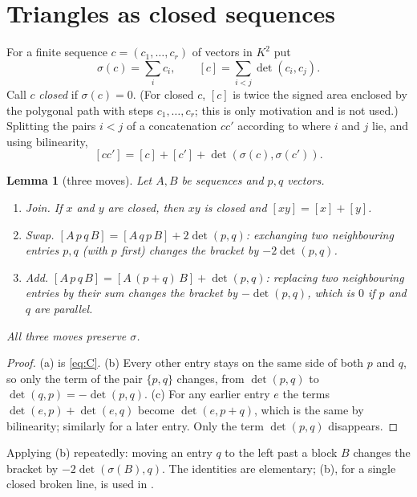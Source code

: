 \documentclass[11pt]{article}
\newtheorem{lemma}[theorem]{Lemma}
\theoremstyle{definition}
\newcommand{\sg}{\sigma}
\newcommand{\ar}[1]{[#1]}
\begin{document}
\section{Triangles as closed sequences}\label{sec:seq}

For a finite sequence $c=(c_1,\dots,c_r)$ of vectors in $K^2$ put
\[ \sg(c)=\sum_ic_i,\qquad\ar c=\sum_{i<j}\det(c_i,c_j). \]
Call $c$ \emph{closed} if $\sg(c)=0$. (For closed $c$, $\ar c$ is twice the signed area enclosed by
the polygonal path with steps $c_1,\dots,c_r$; this is only motivation and is not used.) Splitting
the pairs $i<j$ of a concatenation $cc'$ according to where $i$ and $j$ lie, and using bilinearity,
\begin{equation}\label{eq:C}
\ar{cc'}=\ar c+\ar{c'}+\det(\sg(c),\sg(c')).
\end{equation}

\begin{lemma}[three moves]\label{lem:moves}
Let $A,B$ be sequences and $p,q$ vectors.
\begin{enumerate}[label=(\alph*)]
\item \emph{Join.} If $x$ and $y$ are closed, then $xy$ is closed and $\ar{xy}=\ar x+\ar y$.
\item \emph{Swap.} $\ar{A\,p\,q\,B}=\ar{A\,q\,p\,B}+2\det(p,q)$: exchanging two neighbouring entries
$p,q$ (with $p$ first) changes the bracket by $-2\det(p,q)$.
\item \emph{Add.} $\ar{A\,p\,q\,B}=\ar{A\,(p+q)\,B}+\det(p,q)$: replacing two neighbouring entries by
their sum changes the bracket by $-\det(p,q)$, which is $0$ if $p$ and $q$ are parallel.
\end{enumerate}
All three moves preserve $\sg$.
\end{lemma}

\begin{proof}
(a) is \eqref{eq:C}. (b) Every other entry stays on the same side of both $p$ and $q$, so only the
term of the pair $\{p,q\}$ changes, from $\det(p,q)$ to $\det(q,p)=-\det(p,q)$. (c) For any earlier
entry $e$ the terms $\det(e,p)+\det(e,q)$ become $\det(e,p+q)$, which is the same by bilinearity;
similarly for a later entry. Only the term $\det(p,q)$ disappears.
\end{proof}

Applying (b) repeatedly: moving an entry $q$ to the left past a block $B$ changes the bracket by
$-2\det(\sg(B),q)$. The identities are elementary; (b), for a single closed broken line, is used
in \cite[proof of Lemma 5]{Rud12}.
\end{document}
